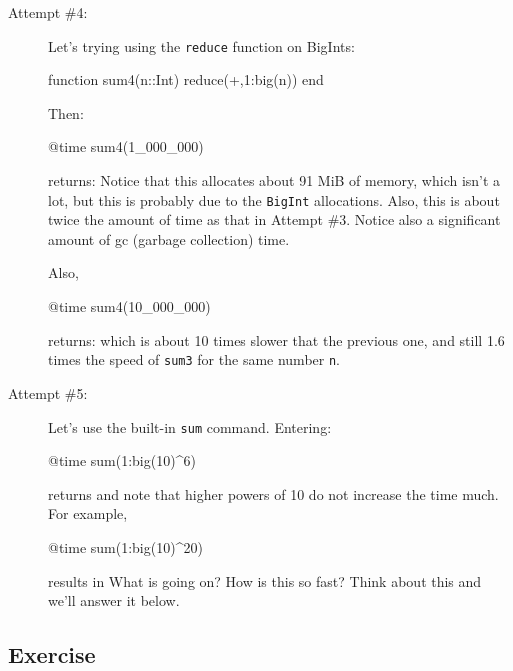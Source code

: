 \begin{description}
\item[Attempt \#4:]

Let's trying using the \texttt{reduce} function on BigInts:

\begin{jlblock}[fastcode]
function sum4(n::Int)
    reduce(+,1:big(n))
end
\end{jlblock}

Then:
%
\begin{jlblock}[fastcode]
@time sum4(1_000_000)
\end{jlblock}
%
returns:  \printpythontex[verbatim]
%
Notice that this allocates about 91 MiB of memory, which isn't a lot, but this is probably due to the \texttt{BigInt} allocations.  Also, this is about twice the amount of time as that in Attempt \#3. Notice also a significant amount of gc (garbage collection) time.  

 Also,
%
\begin{jlblock}[fastcode]
@time sum4(10_000_000)
\end{jlblock}
%
returns:  \printpythontex[verbatim]
%
which is about 10 times slower that the previous one, and still 1.6 times the speed of \texttt{sum3} for the same number \texttt{n}. 

\item[Attempt \#5:]

Let's use the built-in \texttt{sum} command. Entering:

\begin{jlblock}[fastcode]
@time sum(1:big(10)^6)
\end{jlblock}

returns \printpythontex[verabtim]
%
and note that higher powers of 10 do not increase the time much. For example,

\begin{jlblock}[fastcode]
@time sum(1:big(10)^20)
\end{jlblock}
%
results in \printpythontex[verbatim]
 What is going on? How is this so fast?  Think about this and we'll answer it below. 

\end{description}

\subsection{Exercise}

